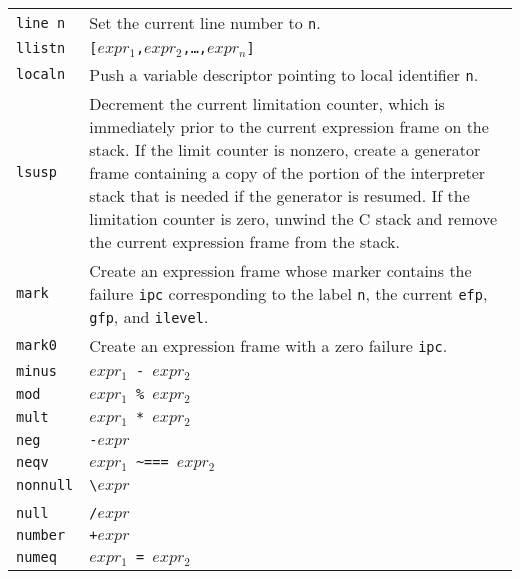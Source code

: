 \begin{xtabular}{l@{\hspace{1.5cm}}p{13.5cm}}
\texttt{line n}  & Set the current line number to \texttt{n}.\\

\texttt{llistn } & \texttt{[$expr_1$,$expr_2$,\dots,$expr_n$]}\\

\texttt{localn } & Push a variable descriptor pointing to local identifier \texttt{n}.\\

\texttt{lsusp}   & Decrement the current limitation counter, which is
immediately prior to the current expression frame on the stack. If the
limit counter is nonzero, create a generator frame containing a copy
of the portion of the interpreter stack that is needed if the
generator is resumed. If the limitation counter is zero, unwind the C
stack and remove the current expression frame from the stack.\\

\texttt{mark}    & Create an expression frame whose marker contains the failure
\texttt{ipc} corresponding to the label \texttt{n}, the current \texttt{efp},
\texttt{gfp}, and \texttt{ilevel}.\\


\texttt{mark0}   & Create an expression frame with a zero failure \texttt{ipc}.\\

\texttt{minus}   & \texttt{$expr_1$ - $expr_2$}\\

\texttt{mod}     & \texttt{$expr_1$ \% $expr_2$}\\

\texttt{mult}    & \texttt{$expr_1$ * $expr_2$}\\

\texttt{neg}     & \texttt{{}-$expr$}\\

\texttt{neqv}    & \texttt{$expr_1$ \textasciitilde=== $expr_2$}\\

\texttt{nonnull} & \texttt{{\textbackslash}$expr$}\\

\\

\texttt{null}    &\texttt{/$expr$}\\

\texttt{number}  & \texttt{+$expr$}\\

\texttt{numeq}   & \texttt{$expr_1$ = $expr_2$}\\


\end{xtabular}
